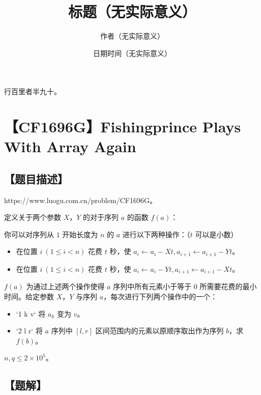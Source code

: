 \documentclass[UTF8,12pt,a4paper]{ctexart}
\title{标题（无实际意义）}
\author{作者（无实际意义）}
\date{日期时间（无实际意义）}
\begin{document}
	\fontsize{12pt}{12pt}\selectfont
	
	\newpage
	\pagestyle{fancy}
	
	
	行百里者半九十。
	
	
	\section*{【CF1696G】Fishingprince Plays With Array Again}
	
	\subsection*{【题目描述】}
	
	https://www.luogu.com.cn/problem/CF1696G。
	
	定义关于两个参数 $X$，$Y$ 的对于序列 $a$ 的函数 $f(a)$：
	
	你可以对序列从 $1$ 开始长度为 $n$ 的 $a$ 进行以下两种操作：（$t$ 可以是小数）
	
	\begin{itemize}
		\item 在位置 $i\ (1\le i<n)$ 花费 $t$ 秒，使 $a_i\gets a_i-Xt,a_{i+1}\gets a_{i+1}-Yt$。
		\item 在位置 $i\ (1\le i<n)$ 花费 $t$ 秒，使 $a_i\gets a_i-Yt,a_{i+1}\gets a_{i+1}-Xt$。
	\end{itemize}
	
	$f(a)$ 为通过上述两个操作使得 $a$ 序列中所有元素小于等于 $0$ 所需要花费的最小时间。给定参数 $X$，$Y$ 与序列 $a$，每次进行下列两个操作中的一个：
	
	\begin{itemize}
		\item `1 k v` 将 $a_k$ 变为 $v$。
		\item `2 l r` 将 $a$ 序列中 $[l,r]$ 区间范围内的元素以原顺序取出作为序列 $b$，求 $f(b)$。
	\end{itemize}

	$n,q\le 2\times 10^5$。
	
	\subsection*{【题解】}
	
\end{document}
